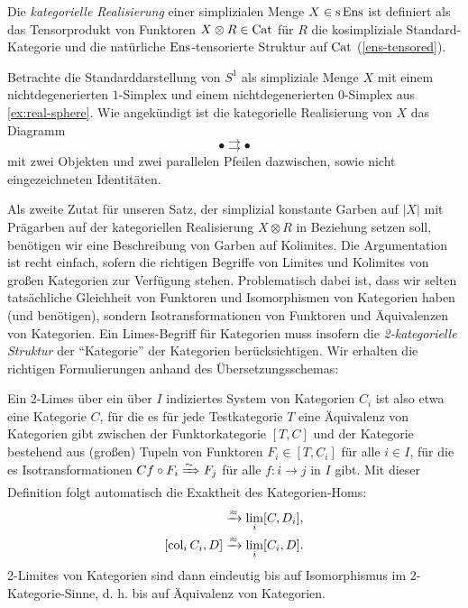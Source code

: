 \begin{defn}
  Die \emph{kategorielle Realisierung} einer simplizialen Menge $X \in
  \operatorname{s}\operatorname{Ens}$ ist definiert als das Tensorprodukt von Funktoren $X \otimes
  R \in \operatorname{Cat}$ für $R$ die kosimpliziale Standard-Kategorie und die
  natürliche $\operatorname{Ens}$-tensorierte Struktur auf $\operatorname{Cat}$
  (\ref{ens-tensored}).
\end{defn}
\begin{bsp}
  Betrachte die Standarddarstellung von $S^1$ als simpliziale Menge
  $X$ mit einem nichtdegenerierten $1$-Simplex und einem
  nichtdegenerierten $0$-Simplex aus \ref{ex:real-sphere}. Wie
  angekündigt ist die kategorielle Realisierung von $X$ das Diagramm
  \[ \bullet \rightrightarrows \bullet \]
  mit zwei Objekten und zwei parallelen Pfeilen dazwischen, sowie
  nicht eingezeichneten Identitäten.
\end{bsp}

Als zweite Zutat für unseren Satz, der simplizial konstante Garben auf
$|X|$ mit Prägarben auf der kategoriellen Realisierung $X \otimes R$
in Beziehung setzen soll, benötigen wir eine Beschreibung von Garben
auf Kolimites. Die Argumentation ist recht einfach, sofern die
richtigen Begriffe von Limites und Kolimites von großen Kategorien zur
Verfügung stehen. Problematisch dabei ist, dass wir selten
tatsächliche Gleichheit von Funktoren und Isomorphismen von Kategorien
haben (und benötigen), sondern Isotransformationen von Funktoren und
Äquivalenzen von Kategorien. Ein Limes-Begriff für Kategorien muss
insofern die \emph{2-kategorielle Struktur} der ``Kategorie'' der
Kategorien berücksichtigen. Wir erhalten die richtigen Formulierungen
anhand des Übersetzungsschemas:

Ein 2-Limes über ein über $I$ indiziertes System von Kategorien $C_i$
ist also etwa eine Kategorie $C$, für die es für jede Testkategorie
$T$ eine Äquivalenz von Kategorien gibt zwischen der Funktorkategorie
$[T, C]$ und der Kategorie bestehend aus (großen) Tupeln von Funktoren
$F_i \in [T, C_i]$ für alle $i \in I$, für die es Isotransformationen
$Cf \circ F_i \xRightarrow{\sim} F_j$ für alle $f: i \to j$ in $I$ gibt. Mit
dieser Definition folgt automatisch die Exaktheit des Kategorien-Homs:
\begin{align*}
  [C, \lim_i D_i] &\qiso \lim_i [C, D_i], \\
  [\col_i C_i, D] &\qiso \lim_i [C_i, D].
\end{align*}
2-Limites von Kategorien sind dann eindeutig bis auf Isomorphismus im
2-Kategorie-Sinne, d. h. bis auf Äquivalenz von Kategorien.


